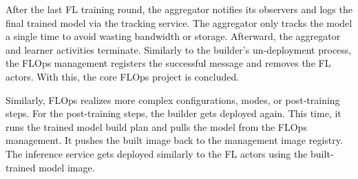 After the last FL training round, the aggregator notifies its observers and logs the final trained model via the tracking service.
The aggregator only tracks the model a single time to avoid wasting bandwidth or storage.
Afterward, the aggregator and learner activities terminate.
Similarly to the builder's un-deployment process, the FLOps management registers the successful message and removes the FL actors.
With this, the core FLOps project is concluded.

Similarly, FLOps realizes more complex configurations, modes, or post-training steps.
For the post-training steps, the builder gets deployed again.
This time, it runs the trained model build plan and pulls the model from the FLOps management.
It pushes the built image back to the management image registry.
The inference service gets deployed similarly to the FL actors using the built-trained model image.
